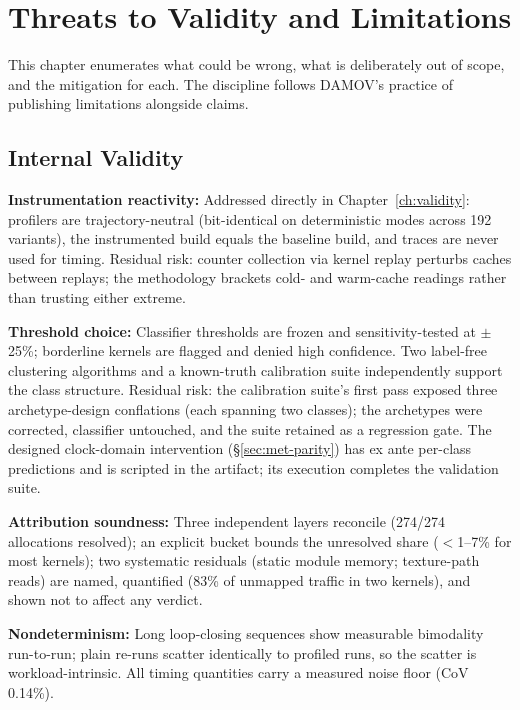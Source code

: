 \chapter{Threats to Validity and Limitations}
\label{ch:threats}

This chapter enumerates what could be wrong, what is deliberately out of scope, and the mitigation for each. The discipline follows DAMOV's practice of publishing limitations alongside claims.

\section{Internal Validity}

\textbf{Instrumentation reactivity:} Addressed directly in Chapter~\ref{ch:validity}: profilers are trajectory-neutral (bit-identical on deterministic modes across 192 variants), the instrumented build equals the baseline build, and traces are never used for timing. Residual risk: counter collection via kernel replay perturbs caches between replays; the methodology brackets cold- and warm-cache readings rather than trusting either extreme.

\textbf{Threshold choice:} Classifier thresholds are frozen and sensitivity-tested at $\pm$25\%; borderline kernels are flagged and denied high confidence. Two label-free clustering algorithms and a known-truth calibration suite independently support the class structure. Residual risk: the calibration suite's first pass exposed three archetype-design conflations (each spanning two classes); the archetypes were corrected, classifier untouched, and the suite retained as a regression gate. The designed clock-domain intervention (\S\ref{sec:met-parity}) has ex ante per-class predictions and is scripted in the artifact; its execution completes the validation suite.

\textbf{Attribution soundness:} Three independent layers reconcile (274/274 allocations resolved); an explicit  bucket bounds the unresolved share ($<$1--7\% for most kernels); two systematic residuals (static module memory; texture-path reads) are named, quantified (83\% of unmapped traffic in two kernels), and shown not to affect any verdict.

\textbf{Nondeterminism:} Long loop-closing sequences show measurable bimodality run-to-run; plain re-runs scatter identically to profiled runs, so the scatter is workload-intrinsic. All timing quantities carry a measured noise floor (CoV 0.14\%).

